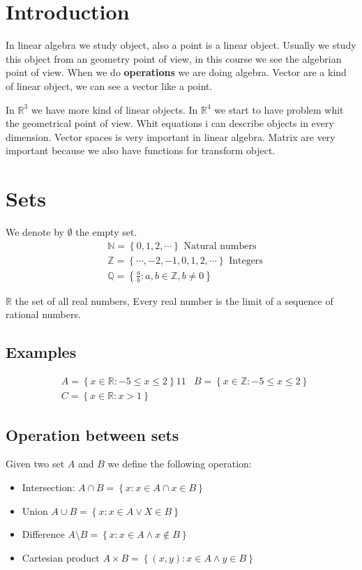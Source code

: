 \section{Introduction}
In linear algebra we study object, also a point is a linear object. Usually we study this object from an geometry point of view, in this course we see the algebrian point of view. When we do \textbf{operations} we are doing algebra. Vector are a kind of linear object, we can see a vector like a point.

In $\mathbb{R}^3$ we have more kind of linear objects. In $\mathbb{R}^4$ we start to have problem whit the geometrical point of view. Whit equations i can describe objects in every dimension. Vector spaces is very important in linear algebra. Matrix are very important because we also have functions for transform object.
\section{Sets}
We denote by $\emptyset$ the empty set.
\begin{align*}
&\mathbb{N} = \left\{ 0, 1, 2, \cdots \right\} \text{ Natural numbers}\\
&\mathbb{Z} = \left\{\cdots, -2, -1, 0, 1, 2, \cdots \right\} \text{ Integers}\\
&\mathbb{Q} = \left\{ \frac{a}{b} : a, b \in \mathbb{Z}, b \ne 0 \right\}
\end{align*}
\begin{center}
    $\mathbb{R}$ the set of all  real numbers, Every real number is the limit of a sequence of rational numbers.
\end{center}

\subsection{Examples}
\begin{align*}
&A = \left\{ x \in \mathbb{R} : -5 \le x \le 2\right\}11
&B = \left\{ x \in \mathbb{Z} : -5 \le x \le 2 \right\}\\
&C = \left\{ x \in \mathbb{R} : x > 1 \right\}
\end{align*}
\subsection{Operation between sets}
Given two set $A$ and $B$ we define the following operation: 
\begin{itemize}
    \item Intersection: $A \cap B = \left\{ x : x \in A \cap x \in B\right\}$
    \item Union $A \cup B = \left\{ x: x \in A \lor X \in B \right\}$
    \item Difference $A \setminus B = \left\{ x : x \in A \land x \not\in B \right\}$
    \item Cartesian product $A \times B = \left\{ (x,y): x \in A \land y \in B \right\}$
\end{itemize}
